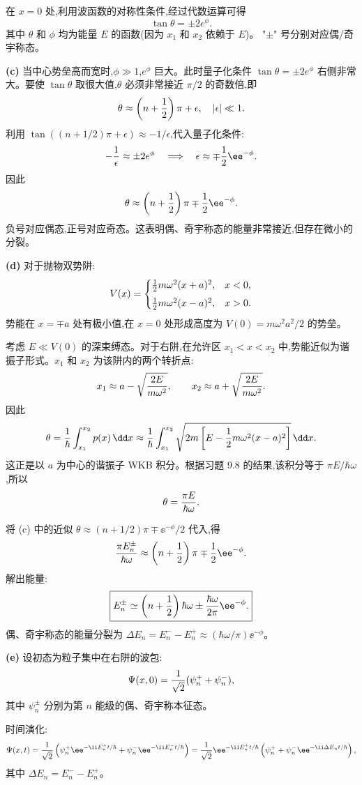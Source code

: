 \begin{solution}
在 $x=0$ 处,利用波函数的对称性条件,经过代数运算可得
\[
\boxed{\tan\theta=\pm2e^\phi.}
\]
其中 $\theta$ 和 $\phi$ 均为能量 $E$ 的函数(因为 $x_1$ 和 $x_2$ 依赖于 $E$)。 "$\pm$" 号分别对应偶/奇宇称态。

\textbf{(c)} 当中心势垒高而宽时,$\phi\gg1$,$e^\phi$ 巨大。此时量子化条件 $\tan\theta=\pm2e^\phi$ 右侧非常大。要使 $\tan\theta$ 取很大值,$\theta$ 必须非常接近 $\pi/2$ 的奇数倍,即
\[
\theta\approx\left(n+{1\over2}\right)\pi+\epsilon,\quad |\epsilon|\ll1.
\]
利用 $\tan\left((n+1/2)\pi+\epsilon\right)\approx-1/\epsilon$,代入量子化条件:
\[
-{1\over\epsilon}\approx\pm2e^\phi\quad\Longrightarrow\quad
\epsilon\approx\mp{1\over2}\ee^{-\phi}.
\]
因此
\[
\theta\approx\left(n+{1\over2}\right)\pi\mp{1\over2}\ee^{-\phi}.
\]
负号对应偶态,正号对应奇态。这表明偶、奇宇称态的能量非常接近,但存在微小的分裂。

\textbf{(d)} 对于抛物双势阱:
\[
V(x)=\begin{cases}
{1\over2}m\omega^2(x+a)^2, & x<0,\\[4pt]
{1\over2}m\omega^2(x-a)^2, & x>0.
\end{cases}
\]
势能在 $x=\mp a$ 处有极小值,在 $x=0$ 处形成高度为 $V(0)=m\omega^2a^2/2$ 的势垒。

考虑 $E\ll V(0)$ 的深束缚态。对于右阱,在允许区 $x_1<x<x_2$ 中,势能近似为谐振子形式。$x_1$ 和 $x_2$ 为该阱内的两个转折点:
\[
x_1\approx a-\sqrt{2E\over m\omega^2},\qquad
x_2\approx a+\sqrt{2E\over m\omega^2}.
\]
因此
\[
\theta={1\over\hbar}\int_{x_1}^{x_2}p(x)\,\dd x
\approx{1\over\hbar}\int_{x_1}^{x_2}\sqrt{2m\left[E-{1\over2}m\omega^2(x-a)^2\right]}\,\dd x.
\]
这正是以 $a$ 为中心的谐振子 WKB 积分。根据习题 9.8 的结果,该积分等于 $\pi E/\hbar\omega$,所以
\[
\theta={\pi E\over\hbar\omega}.
\]

将 (c) 中的近似 $\theta\approx(n+1/2)\pi\mp \ee^{-\phi}/2$ 代入,得
\[
{\pi E_n^\pm\over\hbar\omega}\approx\left(n+{1\over2}\right)\pi\mp{1\over2}\ee^{-\phi}.
\]
解出能量:
\[
\boxed{E_n^\pm\simeq\left(n+{1\over2}\right)\hbar\omega
\pm{\hbar\omega\over2\pi}\ee^{-\phi}.}
\]
偶、奇宇称态的能量分裂为 $\Delta E_n=E_n^--E_n^+\approx(\hbar\omega/\pi)\ee^{-\phi}$。

\textbf{(e)} 设初态为粒子集中在右阱的波包:
\[
\Psi(x,0)={1\over\sqrt2}(\psi_n^++\psi_n^-),
\]
其中 $\psi_n^\pm$ 分别为第 $n$ 能级的偶、奇宇称本征态。

时间演化:
\[
\Psi(x,t)={1\over\sqrt2}\left(
\psi_n^+ \ee^{-\ii E_n^+ t/\hbar}
+\psi_n^- \ee^{-\ii E_n^- t/\hbar}
\right)
={1\over\sqrt2}\ee^{-\ii E_n^+ t/\hbar}\left(
\psi_n^+ +\psi_n^- \ee^{-\ii\Delta E_n t/\hbar}
\right),
\]
其中 $\Delta E_n=E_n^--E_n^+$。


\end{solution}
